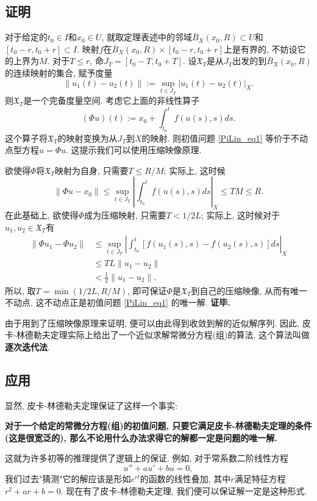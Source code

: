 \subsection{证明}
对于给定的$t_0\in I$和$x_0\in U$, 就取定理表述中的邻域$\bar B_X(x_0,R)\subset U$和$[t_0-r,t_0+r]\subset I$. 映射$f$在$\bar B_X(x_0,R)\times[t_0-r,t_0+r]$上是有界的, 不妨设它的上界为$M$. 对于$T\leq r$, 命$J_T=[t_0-T,t_0+T]$. 设$\mathfrak{X}_T$是从$J_T$出发的到$\bar B_X(x_0,R)$的连续映射的集合, 赋予度量
$$
\|u_1(t)-u_2(t)\|:=\sup_{t\in J_T}|u_1(t)-u_2(t)|_X.
$$
则$\mathfrak{X}_T$是一个完备度量空间. 考虑它上面的非线性算子
$$
(\Phi u)(t):=x_0+\int_{t_0}^tf(u(s),s)ds.
$$ 
这个算子将$\mathfrak{X}_T$的映射变换为从$J_T$到$X$的映射. 则初值问题 \autoref{PiLin_eq1} 等价于不动点型方程$u=\Phi u$. 这提示我们可以使用压缩映像原理.

欲使得$\Phi$将$\mathfrak{X}_T$映射为自身, 只需要$T\leq R/M$; 实际上, 这时候
$$
\|\Phi u-x_0\|
\leq\sup_{t\in J_T}\left|\int_{t_0}^tf(u(s),s)ds\right|_X
\leq TM\leq R.
$$
在此基础上, 欲使得$\Phi$成为压缩映射, 只需要$T<1/2L$; 实际上, 这时候对于$u_1,u_2\in\mathfrak{X}_T$有
$$
\begin{aligned}
\|\Phi u_1-\Phi u_2\|
&\leq\sup_{t\in J_T}\left|\int_{t_0}^t[f(u_1(s),s)-f(u_2(s),s)]ds\right|_X \\
&\leq TL\|u_1-u_2\|\\
&<\frac{1}{2}\|u_1-u_2\|.
\end{aligned}
$$
所以, 取$T=\min\left(1/2L,R/M\right)$, 即可保证$\Phi$是$\mathfrak{X}_T$到自己的压缩映像, 从而有唯一不动点. 这不动点正是初值问题 \autoref{PiLin_eq1} 的唯一解. \textbf{证毕.}

由于用到了压缩映像原理来证明, 便可以由此得到收敛到解的近似解序列. 因此, 皮卡-林德勒夫定理实际上给出了一个近似求解常微分方程(组)的算法. 这个算法叫做\textbf{逐次迭代法}.

\subsection{应用}
显然, 皮卡-林德勒夫定理保证了这样一个事实: 

\textbf{对于一个给定的常微分方程(组)的初值问题, 只要它满足皮卡-林德勒夫定理的条件(这是很宽泛的), 那么不论用什么办法求得它的解都一定是问题的唯一解.}

这就为许多初等的推理提供了逻辑上的保证. 例如, 对于常系数二阶线性方程
$$
u''+au'+bu=0,
$$
我们过去"猜测"它的解应该是形如$e^{rt}$的函数的线性叠加, 其中$r$满足特征方程$r^2+ar+b=0$. 现在有了皮卡-林德勒夫定理, 我们便可以保证解一定是这种形式.